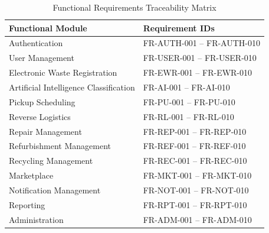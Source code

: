 \begin{table}[H]
\centering
\caption{Functional Requirements Traceability Matrix}
\label{tab:fr_traceability}

\begin{tabular}{|p{6cm}|p{5cm}|}

\hline
\textbf{Functional Module} &
\textbf{Requirement IDs} \\
\hline

Authentication &
FR-AUTH-001 -- FR-AUTH-010 \\
\hline

User Management &
FR-USER-001 -- FR-USER-010 \\
\hline

Electronic Waste Registration &
FR-EWR-001 -- FR-EWR-010 \\
\hline

Artificial Intelligence Classification &
FR-AI-001 -- FR-AI-010 \\
\hline

Pickup Scheduling &
FR-PU-001 -- FR-PU-010 \\
\hline

Reverse Logistics &
FR-RL-001 -- FR-RL-010 \\
\hline

Repair Management &
FR-REP-001 -- FR-REP-010 \\
\hline

Refurbishment Management &
FR-REF-001 -- FR-REF-010 \\
\hline

Recycling Management &
FR-REC-001 -- FR-REC-010 \\
\hline

Marketplace &
FR-MKT-001 -- FR-MKT-010 \\
\hline

Notification Management &
FR-NOT-001 -- FR-NOT-010 \\
\hline

Reporting &
FR-RPT-001 -- FR-RPT-010 \\
\hline

Administration &
FR-ADM-001 -- FR-ADM-010 \\
\hline

\end{tabular}

\end{table}

